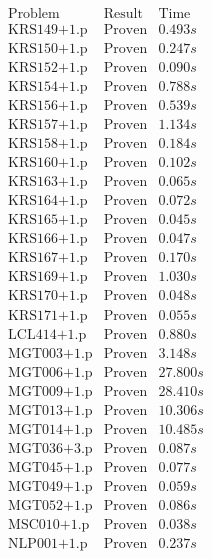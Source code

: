 \documentclass[a4paper,11pt]{report}
\theoremstyle{definition}
\theoremstyle{definition}
\theoremstyle{definition}
\theoremstyle{definition}
\theoremstyle{definition}
\theoremstyle{definition}
\theoremstyle{definition}
\begin{document}
	\begin{minipage}{0.45\textwidth}
		\[\begin{matrix}
			\text{Problem}&\text{Result}&\text{Time}\\
			\text{KRS149+1.p}&\text{Proven}& 0.493 s\\
			\text{KRS150+1.p}&\text{Proven}& 0.247 s\\
			\text{KRS152+1.p}&\text{Proven}& 0.090 s\\
			\text{KRS154+1.p}&\text{Proven}& 0.788 s\\
			\text{KRS156+1.p}&\text{Proven}& 0.539 s\\
			\text{KRS157+1.p}&\text{Proven}& 1.134 s\\
			\text{KRS158+1.p}&\text{Proven}& 0.184 s\\
			\text{KRS160+1.p}&\text{Proven}& 0.102 s\\
			\text{KRS163+1.p}&\text{Proven}& 0.065 s\\
			\text{KRS164+1.p}&\text{Proven}& 0.072 s\\
			\text{KRS165+1.p}&\text{Proven}& 0.045 s\\
			\text{KRS166+1.p}&\text{Proven}& 0.047 s\\
			\text{KRS167+1.p}&\text{Proven}& 0.170 s\\
			\text{KRS169+1.p}&\text{Proven}& 1.030 s\\
			\text{KRS170+1.p}&\text{Proven}& 0.048 s\\
			\text{KRS171+1.p}&\text{Proven}& 0.055 s\\
			\text{LCL414+1.p}&\text{Proven}& 0.880 s\\
			\text{MGT003+1.p}&\text{Proven}& 3.148 s\\
			\text{MGT006+1.p}&\text{Proven}& 27.800 s\\
			\text{MGT009+1.p}&\text{Proven}& 28.410 s\\
			\text{MGT013+1.p}&\text{Proven}& 10.306 s\\
			\text{MGT014+1.p}&\text{Proven}& 10.485 s\\
			\text{MGT036+3.p}&\text{Proven}& 0.087 s\\
			\text{MGT045+1.p}&\text{Proven}& 0.077 s\\
			\text{MGT049+1.p}&\text{Proven}& 0.059 s\\
			\text{MGT052+1.p}&\text{Proven}& 0.086 s\\
			\text{MSC010+1.p}&\text{Proven}& 0.038 s\\
			\text{NLP001+1.p}&\text{Proven}& 0.237 s\\

\end{matrix}\]
\end{minipage}
\end{document}
